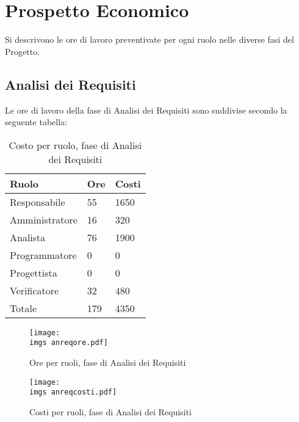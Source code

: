 \section{Prospetto Economico}{
	Si descrivono le ore di lavoro preventivate per ogni ruolo nelle diverse fasi del Progetto.
\subsection{Analisi dei Requisiti}{
	Le ore di lavoro della fase di Analisi dei Requisiti sono suddivise secondo la seguente tabella:
	\begin{table}[H]
		\centering
	  \begin{tabular}{p{}p{}
		    							p{}}
		   \toprule Ruolo & Ore & Costi \\
		   \midrule
		   Responsabile & 55 & 1650 \\
		   Amministratore & 16 & 320 \\
		   Analista & 76 & 1900 \\
		   Programmatore & 0 & 0 \\
		   Progettista & 0 & 0 \\
		   Verificatore & 32 & 480 \\
		   \hline
		   Totale & 179 & 4350 \\
		   \bottomrule
	 \end{tabular}
	 	\label{tab:costorequisiti}
	 	\caption{Costo per ruolo, fase di Analisi dei Requisiti}
	\end{table}
	
	\begin{figure}[H]
		\centering
		\texttt{[image: \\imgs anreqore.pdf]}
		\label{fig:orerequisiti}
		\caption{Ore per ruoli, fase di Analisi dei Requisiti}
	\end{figure}
	\begin{figure}[H]
		\centering
		\texttt{[image: \\imgs anreqcosti.pdf]}
		\label{fig:costorequisiti}
		\caption{Costi per ruoli, fase di Analisi dei Requisiti}
	\end{figure}
}
}

